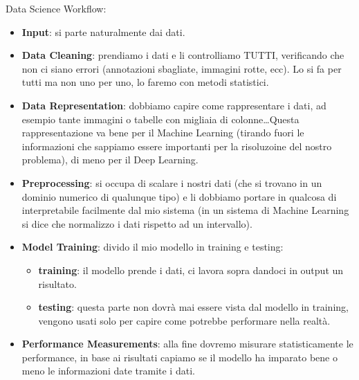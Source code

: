 \documentclass[a4paper,12pt]{article}
\begin{document}
Data Science Workflow:
\begin{itemize}
    \item \textbf{Input}: si parte naturalmente dai dati.
    \item \textbf{Data Cleaning}: prendiamo i dati e li controlliamo TUTTI, verificando che non ci siano errori (annotazioni sbagliate, immagini rotte, ecc). Lo si fa per tutti ma non uno per uno, lo faremo con metodi statistici.
    \item \textbf{Data Representation}: dobbiamo capire come rappresentare i dati, ad esempio tante immagini o tabelle con migliaia di colonne\dots Questa rappresentazione va bene per il Machine Learning (tirando fuori le informazioni che sappiamo essere importanti per la risoluzoine del nostro problema), di meno per il Deep Learning.
    \item \textbf{Preprocessing}: si occupa di scalare i nostri dati (che si trovano in un dominio numerico di qualunque tipo) e li dobbiamo portare in qualcosa di interpretabile facilmente dal mio sistema (in un sistema di Machine Learning si dice che normalizzo i dati rispetto ad un intervallo).
    \item \textbf{Model Training}: divido il mio modello in training e testing:
    \begin{itemize}
        \item \textbf{training}: il modello prende i dati, ci lavora sopra dandoci in output un risultato.
        \item \textbf{testing}: questa parte non dovrà mai essere vista dal modello in training, vengono usati solo per capire come potrebbe performare nella realtà.
    \end{itemize}
    \item \textbf{Performance Measurements}: alla fine dovremo misurare statisticamente le performance, in base ai risultati capiamo se il modello ha imparato bene o meno le informazioni date tramite i dati.
\end{itemize}
\end{document}
